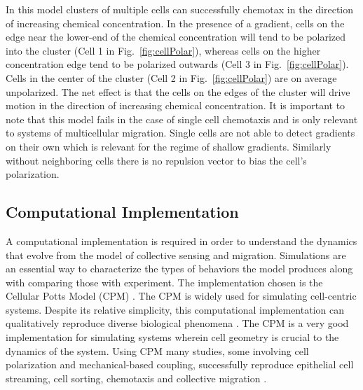 \documentclass[phys,prelim]{puthesis}
\begin{document}
In this model clusters of multiple cells can successfully chemotax in the direction of increasing chemical concentration. In the presence of a gradient, cells on the edge near the lower-end of the chemical concentration will tend to be polarized into the cluster (Cell 1 in Fig.\ \ref{fig:cellPolar}), whereas cells on the higher concentration edge tend to be polarized outwards (Cell 3 in Fig.\ \ref{fig:cellPolar}). Cells in the center of the cluster (Cell 2 in Fig.\ \ref{fig:cellPolar}) are on average unpolarized. The net effect is that the cells on the edges of the cluster will drive motion in the direction of increasing chemical concentration. It is important to note that this model fails in the case of single cell chemotaxis and is only relevant to systems of multicellular migration. Single cells are not able to detect gradients on their own which is relevant for the regime of shallow gradients. Similarly without neighboring cells there is no repulsion vector to bias the cell's polarization.

\subsection{Computational Implementation}

A computational implementation is required in order to understand the dynamics that evolve from the model of collective sensing and migration. Simulations are an essential way to characterize the types of behaviors the model produces along with comparing those with experiment. The implementation chosen is the Cellular Potts Model (CPM) \cite{graner1992simulation,swat2012multi}. The CPM is widely used for simulating cell-centric systems. Despite its relative simplicity, this computational implementation can qualitatively reproduce diverse biological phenomena \cite{maree2007cellular}. The CPM is a very good implementation for simulating systems wherein cell geometry is crucial to the dynamics of the system. Using CPM many studies, some involving cell polarization and mechanical-based coupling, successfully reproduce epithelial cell streaming, cell sorting, chemotaxis and collective migration \cite{maclaren2015models,kabla2012collective,szabo2010collective}.
\end{document}
